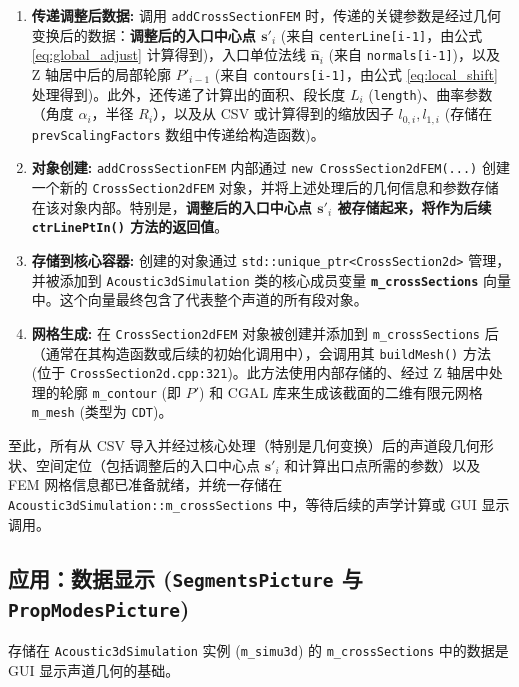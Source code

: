 \documentclass{ctexart}
\begin{document}
\begin{enumerate}
    \item \textbf{传递调整后数据:} 调用 \texttt{addCrossSectionFEM} 时，传递的关键参数是经过几何变换后的数据：\textbf{调整后的入口中心点 \({\mathbf{s}'}_i\)} (来自 \texttt{centerLine[i-1]}，由公式 \eqref{eq:global_adjust} 计算得到)，入口单位法线 \(\hat{\mathbf{n}}_i\) (来自 \texttt{normals[i-1]})，以及 Z 轴居中后的局部轮廓 \(P'_{i-1}\) (来自 \texttt{contours[i-1]}，由公式 \eqref{eq:local_shift} 处理得到)。此外，还传递了计算出的面积、段长度 \(L_i\) (\texttt{length})、曲率参数（角度 \(\alpha_i\)，半径 \(R_i\)），以及从 CSV 或计算得到的缩放因子 \(l_{0,i}, l_{1,i}\) (存储在 \texttt{prevScalingFactors} 数组中传递给构造函数)。
    \item \textbf{对象创建:} \texttt{addCrossSectionFEM} 内部通过 \texttt{new CrossSection2dFEM(...)} 创建一个新的 \texttt{CrossSection2dFEM} 对象，并将上述处理后的几何信息和参数存储在该对象内部。特别是，\textbf{调整后的入口中心点 \({\mathbf{s}'}_i\) 被存储起来，将作为后续 \texttt{ctrLinePtIn()} 方法的返回值}。
    \item \textbf{存储到核心容器:} 创建的对象通过 \texttt{std::unique\_ptr\textless CrossSection2d\textgreater} 管理，并被添加到 \texttt{Acoustic3dSimulation} 类的核心成员变量 \textbf{\texttt{m\_crossSections}} 向量中。这个向量最终包含了代表整个声道的所有段对象。
    \item \textbf{网格生成:} 在 \texttt{CrossSection2dFEM} 对象被创建并添加到 \texttt{m\_crossSections} 后（通常在其构造函数或后续的初始化调用中），会调用其 \texttt{buildMesh()} 方法 (位于 \texttt{CrossSection2d.cpp:321})。此方法使用内部存储的、经过 Z 轴居中处理的轮廓 \texttt{m\_contour} (即 \(P'\)) 和 CGAL 库来生成该截面的二维有限元网格 \texttt{m\_mesh} (类型为 \texttt{CDT})。
\end{enumerate}
至此，所有从 CSV 导入并经过核心处理（特别是几何变换）后的声道段几何形状、空间定位（包括调整后的入口中心点 \({\mathbf{s}'}_i\) 和计算出口点所需的参数）以及 FEM 网格信息都已准备就绪，并统一存储在 \texttt{Acoustic3dSimulation::m\_crossSections} 中，等待后续的声学计算或 GUI 显示调用。

\subsection{应用：数据显示 (\texttt{SegmentsPicture} 与 \texttt{PropModesPicture})}
存储在 \texttt{Acoustic3dSimulation} 实例 (\texttt{m\_simu3d}) 的 \texttt{m\_crossSections} 中的数据是 GUI 显示声道几何的基础。
\end{document}
